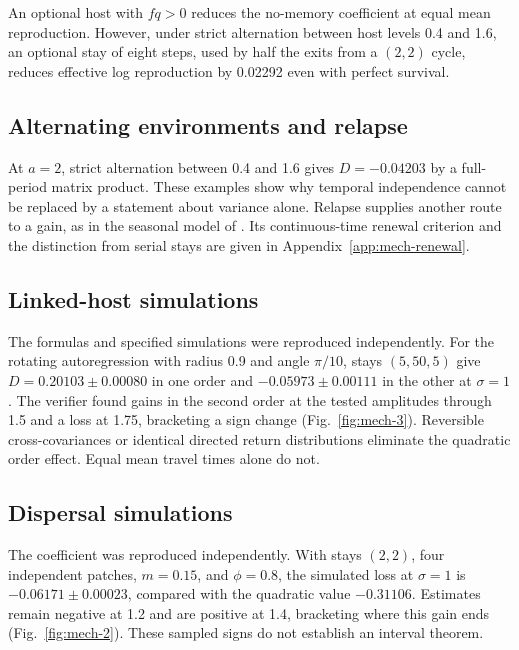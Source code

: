 An optional host with \(fq>0\) reduces the no-memory coefficient at equal mean reproduction. However, under strict alternation between host levels 0.4 and 1.6, an optional stay of eight steps, used by half the exits from a \((2,2)\) cycle, reduces effective log reproduction by 0.02292 even with perfect survival.

\subsection{Alternating environments and relapse}\label{esm:trim-alternation}
At \(a=2\), strict alternation between 0.4 and 1.6 gives \(D=-0.04203\) by a full-period matrix product. These examples show why temporal independence cannot be replaced by a statement about variance alone. Relapse supplies another route to a gain, as in the seasonal model of \citet{white2016}. Its continuous-time renewal criterion and the distinction from serial stays are given in Appendix~\ref{app:mech-renewal}.

\subsection{Linked-host simulations}\label{esm:trim-linked}
The formulas and specified simulations were reproduced independently. For the rotating autoregression with radius 0.9 and angle \(\pi/10\), stays \((5,50,5)\) give \(D=0.20103\pm0.00080\) in one order and \(-0.05973\pm0.00111\) in the other at \(\sigma=1\). The verifier found gains in the second order at the tested amplitudes through 1.5 and a loss at 1.75, bracketing a sign change (Fig.~\ref{fig:mech-3}). Reversible cross-covariances or identical directed return distributions eliminate the quadratic order effect. Equal mean travel times alone do not.

\subsection{Dispersal simulations}\label{esm:trim-dispersal}
The coefficient was reproduced independently. With stays \((2,2)\), four independent patches, \(m=0.15\), and \(\phi=0.8\), the simulated loss at \(\sigma=1\) is \(-0.06171\pm0.00023\), compared with the quadratic value \(-0.31106\). Estimates remain negative at 1.2 and are positive at 1.4, bracketing where this gain ends (Fig.~\ref{fig:mech-2}). These sampled signs do not establish an interval theorem.

